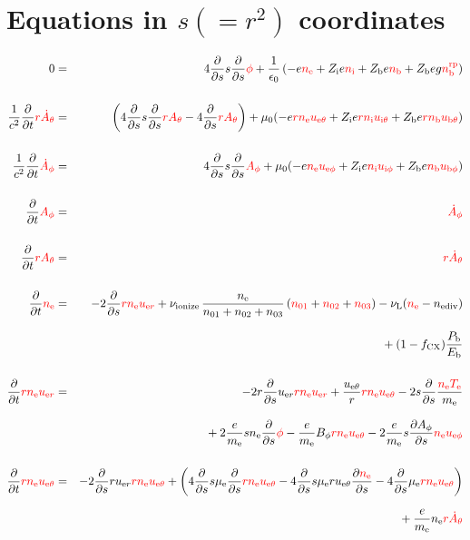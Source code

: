 \documentclass[11pt]{article}
\def\r#1{{\rm#1}}
\def\ddt{\frac{\partial}{\partial t}}
\def\dds{\frac{\partial}{\partial s}}
\def\dd#1{\frac{\partial #1}{\partial s}}
\def\me{m_\r{e}}
\def\mue{\mu_\r{e}}
\def\nee{n_\r{e}}
\def\ni{n_\r{i}}
\def\nb{n_\r{b}}
\def\uer{u_{\r{e}r}}
\def\ueth{u_{\r{e}\theta}}
\def\uith{u_{\r{i}\theta}}
\def\ubth{u_{\r{b}\theta}}
\def\ueph{u_{\r{e}\phi}}
\def\uiph{u_{\r{i}\phi}}
\def\ubph{u_{\r{b}\phi}}
\def\Bph{B_\phi}
\def\Athd{\dot{A}_\theta}
\def\Aphd{\dot{A}_\phi}
\def\Ath{A_\theta}
\def\Aph{A_\phi}
\def\Te{T_\r{e}}
\def\nna{n_{01}}
\def\nnb{n_{02}}
\def\nnc{n_{03}}
\def\Zi{Z_\r{i}}
\def\Zb{Z_\r{b}}
\def\Pb{P_\r{b}}
\def\Eb{E_\r{b}}
\def\nbrp{n_\r{b}^\r{rp}}
\def\fCX{f_\r{CX}}
\def\nuL{\nu_\r{L}}
\def\nuion{\nu_\r{ionize}}
\def\nediv{n_\r{ediv}}
\def\red#1{\textcolor{red}{#1}}
\begin{document}
\bigskip

\section{Equations in $s(=r^2)$ coordinates}
\setcounter{equation}{0}

\begin{eqnarray}
  0 &=&
%
    4 \dds s \dds \red{\phi}
%
  + \frac{1}{\epsilon_0}
%
    \left(-e \red{\nee} + \Zi e \red{\ni} + \Zb e \red{\nb} + \Zb e g \red{\nbrp} \right)
\\[5mm]
  \frac{1}{c^2} \ddt \red{r \Athd} &=&
%
    \left(   4 \dds s \dds \red{r \Ath}
%
           - 4 \dds \red{r \Ath} \right)
%
  + \mu_0 (-e \red{r \nee \ueth} + \Zi e \red{r \ni \uith} + \Zb e \red{r \nb \ubth})
\\[5mm]
  \frac{1}{c^2} \ddt \red{\Aphd} &=&
%
    4 \dds s \dds \red{\Aph}
%
  + \mu_0 (-e \red{\nee \ueph} + \Zi e \red{\ni \uiph} + \Zb e \red{\nb \ubph})
%
\\[5mm]
  \ddt \red{\Aph} &=&
%
  \red{\Aphd}
\\[5mm]
  \ddt \red{r \Ath} &=&
%
  \red{r \Athd}
\\[5mm]
  \ddt \red{\nee} &=&
%
  - 2 \dds \red{r \nee \uer} 
%
  + \nuion\, \frac{\nee}{\nna + \nnb + \nnc}\, (\red{\nna} + \red{\nnb}
  + \red{\nnc})
%
  - \nuL (\red{\nee} - \nediv)
\nonumber\\[3mm]&&{}
%
  + (1 - \fCX) \frac{\Pb}{\Eb}
\\[5mm]
  \ddt \red{r \nee \uer} &=&
%
  - 2 r \dds \uer \red{r \nee \uer}
%
  + \frac{\ueth}{r} \red{r \nee \ueth}
%
  - 2 s \dds \frac{\red{\nee \Te}}{\me}
\nonumber\\[3mm]&&{}
%
  + 2 \frac{e}{\me} s \nee \dds \red{\phi}
%
  - \frac{e}{\me} \Bph \red{r \nee \ueth}
%
  - 2 \frac{e}{\me} s \dd{\Aph} \red{\nee \ueph}
\\[5mm]
  \ddt \red{r \nee \ueth} &=&
%
  - 2 \dds r \uer \red{r \nee \ueth}
%
  + \left(    4 \dds s \mue \dds \red{r \nee \ueth}
%
            - 4 \dds s \mue r \ueth \dd{\red{\nee}}
%
            - 4 \dds \mue \red{r \nee \ueth} \right)
\nonumber\\[2.5mm]&&{}
%
  + \frac{e}{\me} \nee \red{r \Athd}

\end{eqnarray}
\end{document}
